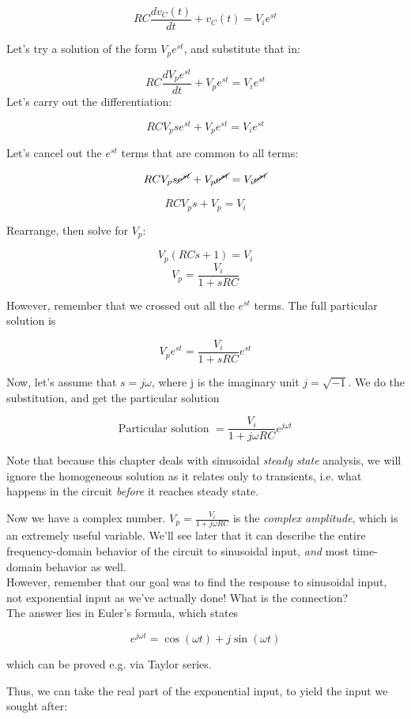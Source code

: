 \documentclass[12pt,a4paper]{report}
\begin{document}
\[ RC \frac{dv_C(t)}{dt} + v_C(t) = V_i e^{s t} \]

Let's try a solution of the form $V_p e^{s t}$, and substitute that in:

\[ RC \frac{d V_p e^{s t}}{dt} + V_p e^{s t} = V_i e^{s t} \]
Let's carry out the differentiation:

\[ RC V_p s e^{s t} + V_p e^{s t} = V_i e^{s t} \]

Let's cancel out the $\displaystyle e^{s t}$ terms that are common to all terms:

\[ RC V_p s \cancel{e^{s t}} + V_p \cancel{e^{s t}} = V_i \cancel{e^{s t}} \]

\[ RC V_p s + V_p = V_i \]

Rearrange, then solve for $V_p$:

\[ V_p (RC s + 1) = V_i \]
\[ V_p = \frac{V_i}{1 + sRC} \]

However, remember that we crossed out all the $\displaystyle e^{s t}$ terms. The full particular solution is

\[ V_p e^{s t} =  \frac{V_i}{1 + sRC} e^{s t} \]

Now, let's assume that $s = j \omega$, where j is the imaginary unit $j = \sqrt{-1}$. We do the substitution, and get the particular solution

\[ \text{Particular solution } = \frac{V_i}{1 + j \omega RC} e^{j \omega t} \]

Note that because this chapter deals with sinusoidal \emph{steady state} analysis, we will ignore the homogeneous solution as it relates only to transients, i.e. what happens in the circuit \emph{before} it reaches steady state.

Now we have a complex number. $\displaystyle V_p = \frac{V_i}{1 + j \omega RC}$ is the \emph{complex amplitude}, which is an extremely useful variable. We'll see later that it can describe the entire frequency-domain behavior of the circuit to sinusoidal input, \emph{and} most time-domain behavior as well.\\

However, remember that our goal was to find the response to sinusoidal input, not exponential input as we've actually done! What is the connection?\\
The answer lies in Euler's formula, which states

\[ e^{j \omega t} = \cos{(\omega t)} + j \sin{(\omega t)} \]

which can be proved e.g. via Taylor series.

Thus, we can take the real part of the exponential input, to yield the input we sought after:
\end{document}
